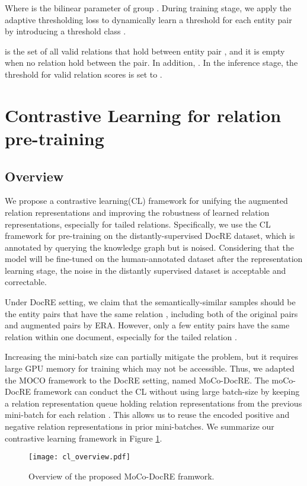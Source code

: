 \documentclass[11pt]{article}
\begin{document}
    Where  is the bilinear parameter of group . During training stage, we apply the adaptive thresholding loss \citep{zhou_atlop_2021} to dynamically learn a threshold  for each entity pair by introducing a threshold class .
    
     is the set of all valid relations that hold between entity pair , and it is empty when no relation hold between the pair. In addition, . In the inference stage, the threshold  for valid relation scores is set to .
   


\section{Contrastive Learning for relation pre-training}
\subsection{Overview}
   We propose a contrastive learning(CL) framework for unifying the augmented relation representations and improving the robustness of learned relation representations, especially for tailed relations. Specifically, we use the CL framework for pre-training on the distantly-supervised DocRE dataset\citep{yao-etal-2019-docred}, which is annotated by querying the knowledge graph but is noised. Considering that the model will be fine-tuned on the human-annotated dataset after the representation learning stage, the noise in the distantly supervised dataset is acceptable and correctable.
    
    Under DocRE setting, we claim that the semantically-similar samples should be the entity pairs that have the same relation , including both of the original pairs and augmented pairs by ERA. However, only a few entity pairs have the same relation within one document, especially for the tailed relation . 
    
    Increasing the mini-batch size can partially mitigate the problem, but it requires large GPU memory for training which may not be accessible. Thus, we adapted the MOCO framework \citep{he_momentum_2020} to the DocRE setting, named MoCo-DocRE. The moCo-DocRE framework can conduct the CL without using large batch-size by keeping a relation representation queue  holding  relation representations from the previous mini-batch for each relation . This allows us to reuse the encoded positive and negative relation representations in prior mini-batches. We summarize our contrastive learning framework in Figure \ref{fig:cl_overview}.
    \begin{figure}[t]
        \centering
        \texttt{[image: cl\_overview.pdf]}
        \caption{Overview of the proposed MoCo-DocRE framwork.}
        \label{fig:cl_overview}
    \end{figure}
\end{document}
